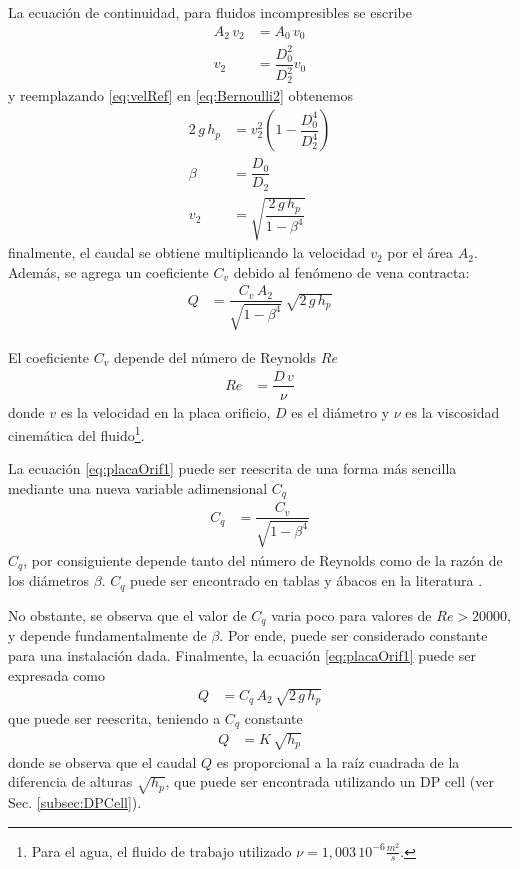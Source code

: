La ecuación de continuidad, para fluidos incompresibles se escribe
\begin{align}
 A_2\,v_2 &= A_0\,v_0 \\
 v_2 &= \dfrac{D_0^2}{D_2^2} v_0
 \label{eq:velRef}
\end{align}
y reemplazando \eqref{eq:velRef} en \eqref{eq:Bernoulli2} obtenemos
\begin{align}
 2 \, g \, h_p &= v_2^2 \left( 1 - \dfrac{D_0^4}{D_2^4} \right)\\
 \beta &= \dfrac{D_0}{D_2}\\
 v_2 &= \sqrt{\dfrac{2 \, g \, h_p}{1-\beta^4}}
\end{align}
finalmente, el caudal se obtiene multiplicando la velocidad $v_2$ por el
área $A_2$.
Además, se agrega un coeficiente $C_v$ debido al fenómeno de vena contracta:
\begin{align}
 Q &= \dfrac{C_v \, A_2}{\sqrt{1-\beta^4}}\, \sqrt{2 \, g \, h_p}
 \label{eq:placaOrif1}
\end{align}

El coeficiente $C_v$ depende del número de Reynolds $Re$
\cite{bib:Mataix, bib:ApuntesPuglesiPlacaOrif}
\begin{align}
Re &= \dfrac{D\,v}{\nu}
\end{align}
donde $v$ es la velocidad en la placa orificio, $D$ es el diámetro y ${\nu}$
es la viscosidad cinemática del fluido\footnote{Para el agua, el fluido de
trabajo utilizado $\nu = 1,003\,10^{-6} \frac{m^2}{s}$.}.

La ecuación \eqref{eq:placaOrif1} puede ser reescrita de una forma más sencilla
mediante una nueva variable adimensional $C_q$
\begin{align}
 C_q &= \dfrac{C_v}{\sqrt{1-\beta^4}}
\end{align}
$C_q$, por consiguiente depende tanto del número de Reynolds como de la razón
de los diámetros $\beta$. $C_q$ puede ser encontrado en tablas y ábacos en la
literatura \cite{bib:Mataix}.

No obstante, se observa que el valor de $C_q$ varia poco para valores de
$Re > 20000$, y depende fundamentalmente de $\beta$.
Por ende, puede ser considerado constante para una instalación dada.
Finalmente, la ecuación \eqref{eq:placaOrif1} puede ser expresada como
\begin{align}
 Q &= C_q\,A_2\, \sqrt{2\,g\,h_p}
\end{align}
que puede ser reescrita, teniendo a $C_q$ constante
\begin{align}
 Q &= K\,\sqrt{h_p}
 \label{eq:placaOrifPLC}
\end{align}
donde se observa que el caudal $Q$ es proporcional a la raíz cuadrada de
la diferencia de alturas $\sqrt{h_p}$, que puede
ser encontrada utilizando un DP cell (ver Sec. \ref{subsec:DPCell}).


